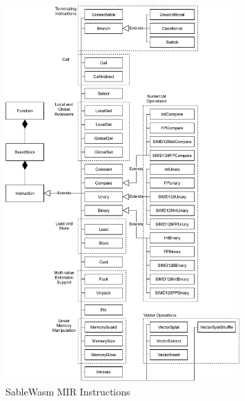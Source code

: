 \begin{figure}
  \centering
  \includegraphics[width=0.8\textwidth]{Images/4.MIR/sablewasm-instruction.pdf}
  \caption{SableWasm MIR Instructions}
  \label{fig:sablewasm-mir-inst}
\end{figure}

